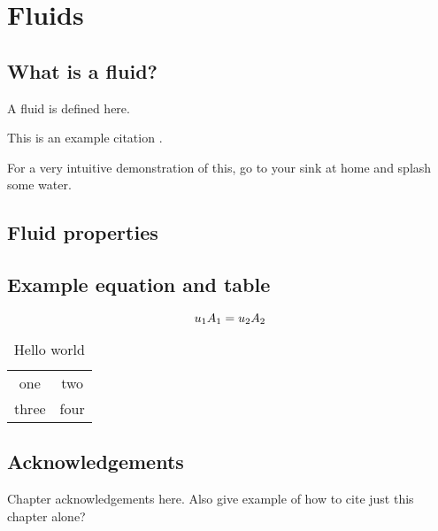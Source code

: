 
\chapter{Fluids}
\label{ch:fluids}

\section{What is a fluid?}

\begin{defn}
A fluid is defined here.
\end{defn}

This is an example citation \cite{Janeway:2392, Evangelista:2010}.

\begin{demo} 
For a very intuitive demonstration of this, go to your sink at home and splash some water.
\end{demo}


\section{Fluid properties}

\section{Example equation and table}

\begin{equation}
u_1 A_1 = u_2 A_2
\label{eq:continuity}
\index{equation!continuity}
\end{equation}

\begin{table}
\caption{Hello world}
\begin{center}
\begin{tabular}{cc}
one & two \\
three & four \\
\end{tabular}
\end{center}
\end{table}

\section*{Acknowledgements}
Chapter acknowledgements here. Also give example of how to cite just this chapter alone\cite{ch:fluids}?

